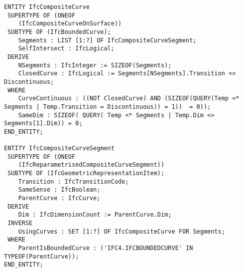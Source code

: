     
    
\begin{lstlisting}[caption={Examples of EXPRESS entity types},label=lst:express-entity-types]
ENTITY IfcCompositeCurve
 SUPERTYPE OF (ONEOF
    (IfcCompositeCurveOnSurface))
 SUBTYPE OF (IfcBoundedCurve);
	Segments : LIST [1:?] OF IfcCompositeCurveSegment;
	SelfIntersect : IfcLogical;
 DERIVE
	NSegments : IfcInteger := SIZEOF(Segments);
	ClosedCurve : IfcLogical := Segments[NSegments].Transition <> Discontinuous;
 WHERE
	CurveContinuous : ((NOT ClosedCurve) AND (SIZEOF(QUERY(Temp <* Segments | Temp.Transition = Discontinuous)) = 1))  = 0));
	SameDim : SIZEOF( QUERY( Temp <* Segments | Temp.Dim <> Segments[1].Dim)) = 0;
END_ENTITY;

ENTITY IfcCompositeCurveSegment
 SUPERTYPE OF (ONEOF
    (IfcReparametrisedCompositeCurveSegment))
 SUBTYPE OF (IfcGeometricRepresentationItem);
	Transition : IfcTransitionCode;
	SameSense : IfcBoolean;
	ParentCurve : IfcCurve;
 DERIVE
	Dim : IfcDimensionCount := ParentCurve.Dim;
 INVERSE
	UsingCurves : SET [1:?] OF IfcCompositeCurve FOR Segments;
 WHERE
	ParentIsBoundedCurve : ('IFC4.IFCBOUNDEDCURVE' IN TYPEOF(ParentCurve));
END_ENTITY;
\end{lstlisting}    
    
    
    
    
    
    



